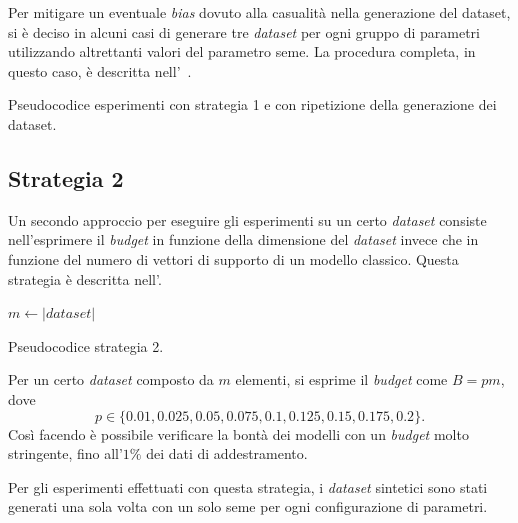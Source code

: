 Per mitigare un eventuale \emph{bias} dovuto alla casualità nella generazione del dataset, si è deciso in alcuni casi di generare tre \emph{dataset} per ogni gruppo di parametri utilizzando altrettanti valori del parametro seme.
La procedura completa, in questo caso, è descritta nell'~.
\begin{algorithm}
    \SetAlgoLined
\caption{Pseudocodice esperimenti con strategia 1 e con ripetizione della generazione dei dataset.}
\label{alg:esperimenti_2}
\end{algorithm}

\subsection{Strategia 2}
Un secondo approccio per eseguire gli esperimenti su un certo \emph{dataset} consiste nell'esprimere il \emph{budget} in funzione della dimensione del \emph{dataset} invece che in funzione del numero di vettori di supporto di un modello classico.
Questa strategia è descritta nell'.
\begin{algorithm}
    \SetAlgoLined
    $m \gets |\textit{dataset}|$\;
\caption{Pseudocodice strategia 2.}
\label{alg:esperimenti_3}
\end{algorithm}
Per un certo \emph{dataset} composto da $m$ elementi, si esprime il \emph{budget} come $B=pm$, dove
\begin{equation*}
    p\in\{0.01, 0.025, 0.05, 0.075, 0.1, 0.125, 0.15, 0.175, 0.2\}.
\end{equation*}
Così facendo è possibile verificare la bontà dei modelli con un \emph{budget} molto stringente, fino all'$1\%$ dei dati di addestramento.

Per gli esperimenti effettuati con questa strategia, i \emph{dataset} sintetici sono stati generati una sola volta con un solo seme per ogni configurazione di parametri.

